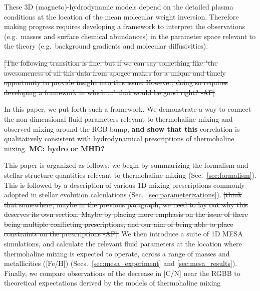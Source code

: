 These 3D (magneto)-hydrodynamic models depend on the detailed plasma conditions at the location of the mean molecular weight inversion. Therefore making progress requires developing a framework to interpret the observations (e.g.~masses and surface chemical abundances) in the parameter space relevant to the theory (e.g.~background gradients and molecular diffusivities).    

%
\sout{[The following transition is fine, but if we can say something like "the awesomeness of all this data from apogee makes for a unique and timely opportunity to provide insight into this issue. However, doing so requires developing a framework in which ..." that would be good right? -AF]}

In this paper, we put forth such a framework. 
We demonstrate a way to connect the non-dimensional fluid parameters relevant to thermohaline mixing and observed mixing around the RGB bump, \textbf{and show that this} correlation is qualitatively consistent with hydrodynamical prescriptions of thermohaline mixing. \textbf{MC: hydro or MHD?} 

This paper is organized as follows: we begin by summarizing the formalism and stellar structure quantities relevant to thermohaline mixing (Sec.~\ref{sec:formalism}). This is followed by a description of various 1D mixing prescriptions commonly adopted in stellar evolution calculations (Sec.~\ref{sec:parameterizations}). \sout{[think that somewhere, maybe in the previous paragraph, we need to lay out why this deserves its own section. Maybe by placing more emphasis on the issue of there being multiple conflicting prescriptions, and our aim of being able to place constraints on the prescriptions -AF].}
We then introduce a suite of 1D MESA simulations, and calculate the relevant fluid parameters at the location where thermohaline mixing is expected to operate, across a range of masses and metallicities ([Fe/H])  (Secs.~\ref{sec:mesa_experiment} and \ref{sec:mesa_results}). 
Finally, we compare observations of the decrease in [C/N] near the RGBB to theoretical expectations derived by the 
models of thermohaline mixing 

